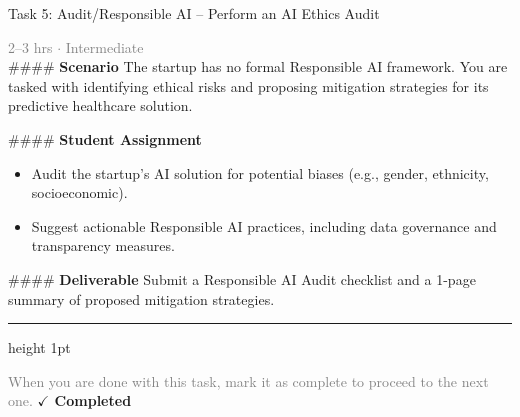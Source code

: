 \documentclass[10pt,a4paper]{article}
\begin{document}
\begin{taskbox}{Task 5: Audit/Responsible AI – Perform an AI Ethics Audit}

    {\small \textcolor{gray}{2--3 hrs $\cdot$ Intermediate}}\\[12pt]

    \#\#\#\# \textbf{Scenario}  
The startup has no formal Responsible AI framework. You are tasked with identifying ethical risks and proposing mitigation strategies for its predictive healthcare solution.  

\#\#\#\# \textbf{Student Assignment}  
\begin{itemize}
    \item Audit the startup’s AI solution for potential biases (e.g., gender, ethnicity, socioeconomic).  
    \item Suggest actionable Responsible AI practices, including data governance and transparency measures.  
\end{itemize}

\#\#\#\# \textbf{Deliverable}  
Submit a Responsible AI Audit checklist and a 1-page summary of proposed mitigation strategies.\par

    \vspace{16pt}

    \textcolor{cardBorder}{\hrule height 1pt}\vspace{8pt}

    \small \textcolor{gray}{When you are done with this task, mark it as complete to proceed to the next one.} \hfill \textbf{\textcolor{brandDark}{$\checkmark$ Completed}}

\end{taskbox}
\end{document}
